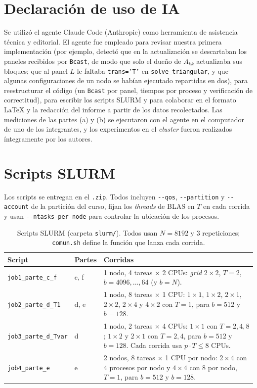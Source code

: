 \documentclass[11pt,a4paper]{article}
\begin{document}
\section*{Declaración de uso de IA}
Se utilizó el agente Claude Code (Anthropic) como herramienta de asistencia técnica y editorial. El agente fue empleado para revisar nuestra primera implementación (por ejemplo, detectó que en la actualización se descartaban los paneles recibidos por \texttt{Bcast}, de modo que solo el dueño de $A_{kk}$ actualizaba sus bloques; que al panel $L$ le faltaba \texttt{trans='T'} en \texttt{solve\_triangular}, y que algunas configuraciones de un nodo se habían ejecutado repartidas en dos), para reestructurar el código (un \texttt{Bcast} por panel, tiempos por proceso y verificación de correctitud), para escribir los scripts SLURM y para colaborar en el formato \LaTeX{} y la redacción del informe a partir de los datos recolectados. Las mediciones de las partes (a) y (b) se ejecutaron con el agente en el computador de uno de los integrantes, y los experimentos en el \emph{cluster} fueron realizados íntegramente por los autores.

\appendix
\section{Scripts SLURM}
Los scripts se entregan en el \texttt{.zip}. Todos incluyen \texttt{-{}-qos}, \texttt{-{}-partition} y \texttt{-{}-account} de la partición del curso, fijan los \emph{threads} de BLAS en $T$ en cada corrida y usan \texttt{-{}-ntasks-per-node} para controlar la ubicación de los procesos.
\begin{table}[H]
\centering\small
\caption{Scripts SLURM (carpeta \texttt{slurm/}). Todos usan $N=8192$ y 3 repeticiones; \texttt{comun.sh} define la función que lanza cada corrida.}
\begin{tabular}{llp{9cm}}
\toprule
\textbf{Script} & \textbf{Partes} & \textbf{Corridas} \\
\midrule
\texttt{job1\_parte\_c\_f} & c, f & 1 nodo, 4 tareas $\times$ 2 CPUs: \emph{grid} $2\times2$, $T=2$, $b=4096,\dots,64$ (y $b=N$). \\
\texttt{job2\_parte\_d\_T1} & d, e & 1 nodo, 8 tareas $\times$ 1 CPU: $1\times1$, $1\times2$, $2\times1$, $2\times2$, $2\times4$ y $4\times2$ con $T=1$, para $b=512$ y $b=128$. \\
\texttt{job3\_parte\_d\_Tvar} & d & 1 nodo, 2 tareas $\times$ 4 CPUs: $1\times1$ con $T=2,4,8$; $1\times2$ y $2\times1$ con $T=2,4$, para $b=512$ y $b=128$. Cada corrida usa $p\cdot T\le8$ CPUs. \\
\texttt{job4\_parte\_e} & e & 2 nodos, 8 tareas $\times$ 1 CPU por nodo: $2\times4$ con 4 procesos por nodo y $4\times4$ con 8 por nodo, $T=1$, para $b=512$ y $b=128$. \\
\bottomrule
\end{tabular}
\end{table}
\end{document}

